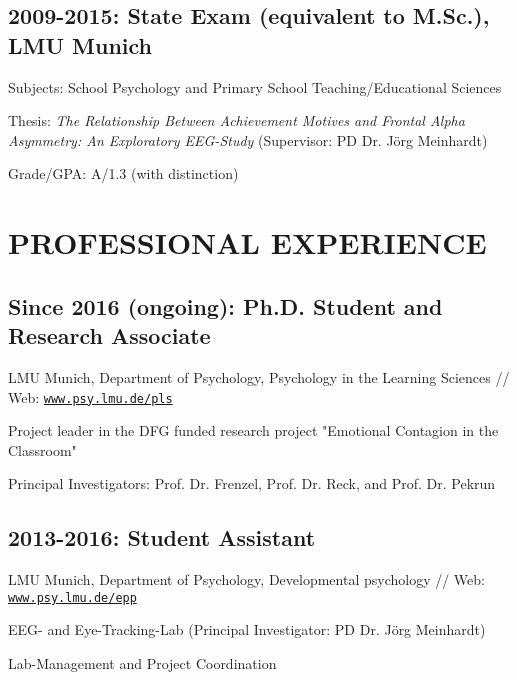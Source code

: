 \documentclass[letterpaper]{article}
\renewenvironment{itemize}{ %
  \begin{list}{}{ %
    \setlength{\leftmargin}{2.5em} %
  }
}{
  \end{list}
}
\begin{document}
\subsection*{2009-2015: State Exam (equivalent to M.Sc.), LMU Munich}
\begin{itemize}
  \item Subjects: School Psychology and Primary School Teaching/Educational Sciences
  \item Thesis: {\it The Relationship Between Achievement Motives and Frontal Alpha Asymmetry: An Exploratory EEG-Study} (Supervisor: PD Dr. Jörg Meinhardt)
  \item Grade/GPA: A/1.3 (with distinction) 
\end{itemize}


\section*{PROFESSIONAL EXPERIENCE}
\subsection*{Since 2016 (ongoing): Ph.D. Student and Research Associate}
\begin{itemize}
  \item LMU Munich, Department of Psychology, Psychology in the Learning Sciences // Web: \href{https://www.psy.lmu.de/pls/}{\tt www.psy.lmu.de/pls}
    \item Project leader in the DFG funded research project "Emotional Contagion in the Classroom"
    \item Principal Investigators: Prof. Dr. Frenzel, Prof. Dr. Reck, and Prof. Dr. Pekrun
    
  \end{itemize}
\subsection*{2013-2016: Student Assistant}
\begin{itemize}
  \item LMU Munich, Department of Psychology, Developmental psychology // Web: \href{https://www.psy.lmu.de/epp/}{\tt www.psy.lmu.de/epp}
    \item EEG- and Eye-Tracking-Lab (Principal Investigator: PD Dr. Jörg Meinhardt)
  \item Lab-Management and Project Coordination
\end{itemize}
\end{document}
